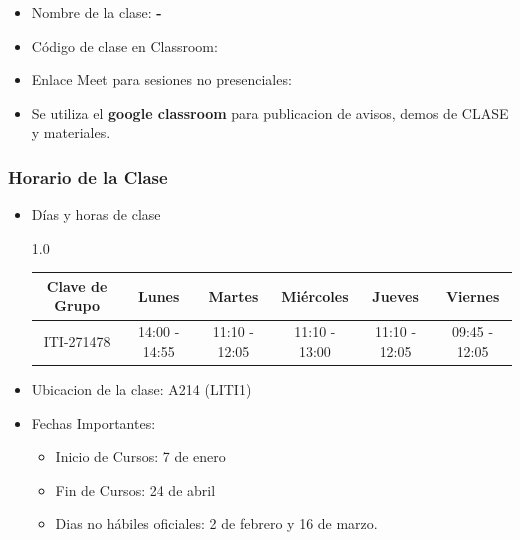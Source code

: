 


\begin{frame}
\begin{itemize}
\frametitle{Plataforma Virtual para el Curso}
\item Nombre de la clase: \textbf{\nombreMateria-\cuatrimestre}
\item Código de clase en Classroom: \textbf{\claveClassroom}
\item Enlace Meet para sesiones no presenciales: \textbf{\claveMeet}
\item Se utiliza el \textbf{google classroom} para publicacion de avisos, demos de CLASE y materiales. %
\end{itemize}
\end{frame}



\begin{frame}
\frametitle{Horario de la Clase}


\begin{itemize}
\item Días y horas de clase
\tiny
\begin{spacing}{1.0}
\begin{center}
\begin{tabular}{c|ccccc}
\hline 
\textbf{Clave de Grupo}   & Lunes          & Martes        & Miércoles     & Jueves        & Viernes          \\ \hline 
ITI-271478                & 14:00 - 14:55 & 11:10 - 12:05 & 11:10 - 13:00 & 11:10 - 12:05 & 09:45 - 12:05    \\ \hline
\hline
\end{tabular}
\end{center}
\end{spacing}
\normalsize
\item Ubicacion de la clase: A214 (LITI1)
\item Fechas Importantes:
\begin{itemize}
\item Inicio de Cursos: 7 de enero
\item Fin de Cursos: 24 de abril
\item Dias no hábiles oficiales: 2 de febrero y 16 de marzo.
\end{itemize}
\end{itemize}

\end{frame}


